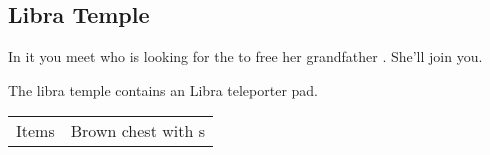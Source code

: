 \subsection{Libra Temple}
\label{map:libra_temple}

In it you meet  who is looking for the  to free her grandfather . She'll join you.

The libra temple contains an Libra teleporter pad.

\begin{longtable}{ l p{9cm} }
	Items & Brown chest with \nameref{weapon:bomb}s
\end{longtable}
